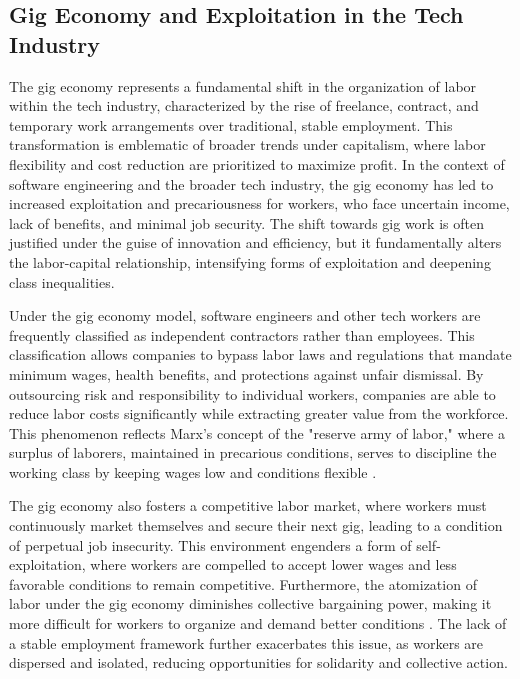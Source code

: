 \begin{refsection}
\section{Gig Economy and Exploitation in the Tech Industry}

The gig economy represents a fundamental shift in the organization of labor within the tech industry, characterized by the rise of freelance, contract, and temporary work arrangements over traditional, stable employment. This transformation is emblematic of broader trends under capitalism, where labor flexibility and cost reduction are prioritized to maximize profit. In the context of software engineering and the broader tech industry, the gig economy has led to increased exploitation and precariousness for workers, who face uncertain income, lack of benefits, and minimal job security. The shift towards gig work is often justified under the guise of innovation and efficiency, but it fundamentally alters the labor-capital relationship, intensifying forms of exploitation and deepening class inequalities.

Under the gig economy model, software engineers and other tech workers are frequently classified as independent contractors rather than employees. This classification allows companies to bypass labor laws and regulations that mandate minimum wages, health benefits, and protections against unfair dismissal. By outsourcing risk and responsibility to individual workers, companies are able to reduce labor costs significantly while extracting greater value from the workforce. This phenomenon reflects Marx's concept of the "reserve army of labor," where a surplus of laborers, maintained in precarious conditions, serves to discipline the working class by keeping wages low and conditions flexible \cite[pp.~781-783]{marx1867capital}.

The gig economy also fosters a competitive labor market, where workers must continuously market themselves and secure their next gig, leading to a condition of perpetual job insecurity. This environment engenders a form of self-exploitation, where workers are compelled to accept lower wages and less favorable conditions to remain competitive. Furthermore, the atomization of labor under the gig economy diminishes collective bargaining power, making it more difficult for workers to organize and demand better conditions \cite[pp.~143-145]{fuchs2014digital}. The lack of a stable employment framework further exacerbates this issue, as workers are dispersed and isolated, reducing opportunities for solidarity and collective action.


\end{refsection}

